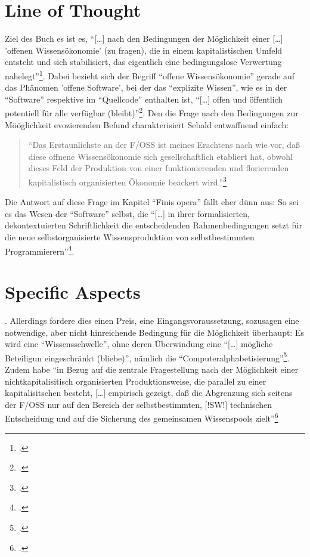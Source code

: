 \documentclass[DIV=calc,BCOR=5mm,11pt,headings=small,oneside,abstract=true, toc=bib]{scrartcl}
\begin{document}
\section{Line of Thought}

Ziel des Buch es ist es, \enquote{[\ldots] nach den Bedingungen der Möglichkeit
einer [\ldots] 'offenen Wissensökonomie' (zu fragen), die in einem
kapitalistischen Umfeld entsteht und sich stabilisiert, das eigentlich eine
bedingungslose Verwertung nahelegt}\footcite[vgl.][17]{Sebald2008a}. Dabei
bezieht sich der Begriff \enquote{offene Wissensökonomie} gerade auf das
Phänomen 'offene Software', bei der das
\enquote{explizite Wissen}, wie es in der \enquote{Software}
respektive im \enquote{Quellcode} enthalten ist, \enquote{[\ldots] offen und
öffentlich potentiell für alle verfügbar
(bleibt)}\footcite[vgl.][17]{Sebald2008a}. Den die Frage nach den
Bedingungen zur Mööglichkeit evozierenden Befund charakterisiert Sebald
entwaffnend einfach:

\begin{quotation}
  \enquote{Das Erstaunlichste an der F/OSS ist meines Erachtens nach wie
  vor, daß diese offnene Wissensökonomie sich gesellschaftlich etabliert
  hat, obwohl dieses Feld der Produktion von einer funktionierenden und
  florierenden kapitalistisch organisierten Ökonomie beackert
  wird.}\footcite[vgl.][23]{Sebald2008a}
\end{quotation} 

Die Antwort auf diese Frage im Kapitel \enquote{Finis opera} fällt eher dünn
aus: So sei es das Wesen der \enquote{Software} selbst, die \enquote{[\ldots] in ihrer
formalisierten, dekontextuierten Schriftlichkeit die entscheidenden
Rahmenbedingungen setzt für die neue selbstorganisierte Wissensproduktion
von selbstbestimmten Programmierern}\footcite[vgl.][236]{Sebald2008a}.
\section{Specific Aspects}. Allerdings fordere dies einen Preis, eine
Eingangsvoraussetzung, sozusagen eine notwendige, aber nicht hinreichende
Bedingung für die Möglichkeit überhaupt: Es wird eine
\enquote{Wissensschwelle}, ohne deren Überwindung eine \enquote{[\ldots]
mögliche Beteiligun eingeschränkt (bliebe)}, nämlich die
\enquote{Computeralphabetisierung}\footcite[vgl.][236]{Sebald2008a}.
Zudem habe \enquote{in Bezug auf die zentrale
Fragestellung nach der Möglichkeit einer nichtkapitalisitisch organisierten Produktionsweise,
die parallel zu einer kapitalisitschen besteht, [\ldots] empirisch
gezeigt, daß die Abgrenzung sich seitens der F/OSS nur auf den Bereich
der selbstbestimmten, [!SW!] technischen Entscheidung und auf die
Sicherung des gemeinsamen Wissenspools
zielt}\footcite[vgl.][237f]{Sebald2008a}
\end{document}

